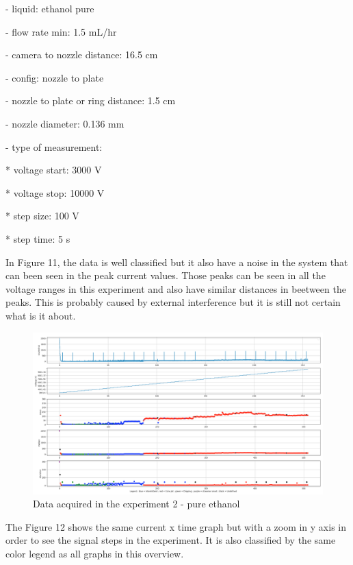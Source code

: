     - liquid: ethanol pure
    
    - flow rate min: 1.5 mL/hr
    
    - camera to nozzle distance: 16.5 cm
    
    - config: nozzle to plate
    
    - nozzle to plate or ring distance: 1.5 cm
    
    - nozzle diameter: 0.136 mm

    - type of measurement: 

        * voltage start: 3000 V

        * voltage stop: 10000 V

        * step size: 100 V 

        * step time: 5 s

    In Figure 11, the data is well classified but it also have a noise in the system that can been seen in the peak current values.
    Those peaks can be seen in all the voltage ranges in this experiment and also have similar distances in beetween the peaks. This is probably caused by
    external interference but it is still not certain what is it about.

    \begin{figure}[H]
        \center
        \includegraphics[width=17cm]{images/images_folder_3/data3.png}
        \caption{Data acquired in the experiment 2 - pure ethanol}
    \end{figure}

    The Figure 12 shows the same current x time graph but with a zoom in y axis in order to see the signal steps in the experiment. It is also classified by the same color legend as all graphs in this overview.



